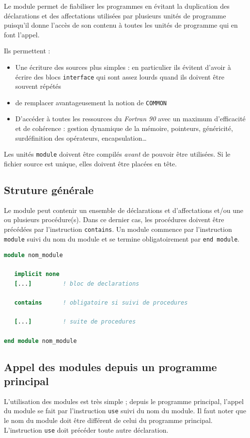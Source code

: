 \documentclass[a4paper,twoside]{article}
\begin{document}
Le module permet de fiabiliser les programmes en évitant la duplication des déclarations et des affectations utilisées par plusieurs unités de programme puisqu'il donne l'accès de son contenu à toutes les unités de programme qui en font l'appel.

Ils permettent : 
\begin{itemize}
\item Une écriture des sources plus simples : en particulier ils évitent d'avoir à écrire des blocs \texttt{interface} qui sont assez lourds quand ils doivent être souvent répétés
\item de remplacer avantageusement la notion de \texttt{COMMON}
\item D'accéder à toutes les ressources du \emph{Fortran 90} avec un maximum d'efficacité et de cohérence : gestion dynamique de la mémoire, pointeurs, généricité, surdéfinition des opérateurs, encapsulation\dots
\end{itemize}

\begin{attention}
Les unités \texttt{module} doivent être compilés \emph{avant} de pouvoir être utilisées. Si le fichier source est unique, elles doivent être placées en tête.
\end{attention}


\subsection{Struture générale}
Le module peut contenir un ensemble de déclarations et d'affectations et/ou une ou plusieurs procédure(s). Dans ce dernier cas, les procédures doivent être précédées par l'instruction \texttt{contains}. Un module commence par l'instruction \texttt{module} suivi du nom du module et se termine obligatoirement par \texttt{end module}.

\begin{lstlisting}[language=Fortran]
module nom_module
   
   implicit none 
   [...]         ! bloc de declarations 

   contains      ! obligatoire si suivi de procedures
   
   [...]         ! suite de procedures
 
end module nom_module
\end{lstlisting}

\subsection{Appel des modules depuis un programme principal}
L'utilisation des modules est très simple ; depuis le programme principal, l'appel du module se fait par l'instruction \texttt{use} suivi du nom du module. Il faut noter que le nom du module doit être différent de celui du programme principal. L'instruction \texttt{use} doit précéder toute autre déclaration.
\end{document}
